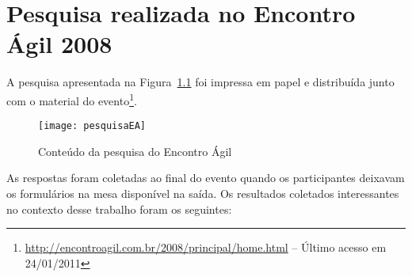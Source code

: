 \chapter{Pesquisa realizada no Encontro Ágil 2008}
\label{ape:EA}

A pesquisa apresentada na Figura~\ref{fig:pesquisaEA} foi impressa em
papel e distribuída junto com o material do
evento\footnote{\url{http://encontroagil.com.br/2008/principal/home.html}
  -- Último acesso em 24/01/2011}.

\begin{figure}[th]
  \centering
  \texttt{[image: pesquisaEA]}
  \caption{Conteúdo da pesquisa do Encontro Ágil}
  \label{fig:pesquisaEA}
\end{figure}

As respostas foram coletadas ao final do evento quando os
participantes deixavam os formulários na mesa disponível na saída. Os
resultados coletados interessantes no contexto desse trabalho foram os
seguintes:


